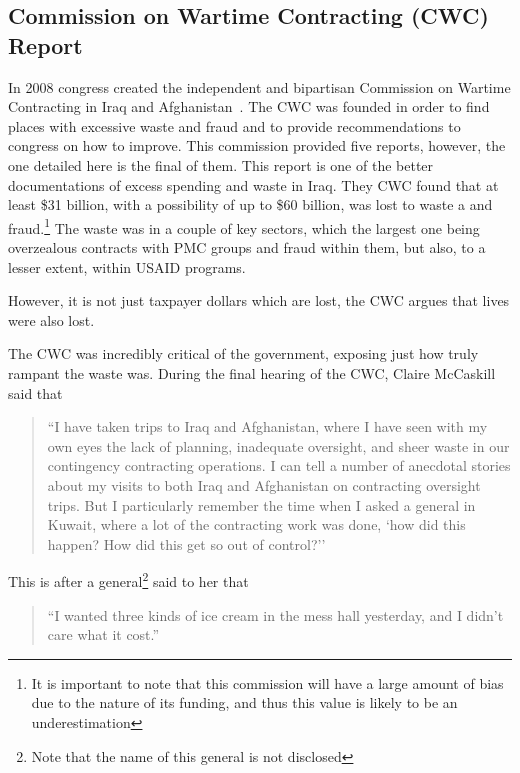 \documentclass{article}
\begin{document}
    \subsection{Commission on Wartime Contracting (CWC) Report}
        In 2008 congress created the independent and bipartisan Commission on Wartime Contracting in Iraq and Afghanistan~\parencite{CWC_2011}. The CWC was founded in order to find places with excessive waste and fraud and to provide recommendations to congress on how to improve. This commission provided five reports, however, the one detailed here is the final of them. This report is one of the better documentations of excess spending and waste in Iraq. They CWC found that at least \$31 billion, with a possibility of up to \$60 billion, was lost to waste a and fraud.\footnote{It is important to note that this commission will have a large amount of bias due to the nature of its funding, and thus this value is likely to be an underestimation} 
        The waste was in a couple of key sectors, which the largest one being overzealous contracts with PMC groups and fraud within them, but also, to a lesser extent, within USAID programs.

        However, it is not just taxpayer dollars which are lost, the CWC argues that lives were also lost. 

        The CWC was incredibly critical of the government, exposing just how truly rampant the waste was. During the final hearing of the CWC, Claire McCaskill said that 
        
        \begin{quote}
            ``I have taken trips to Iraq and Afghanistan, where I have seen with my own eyes the lack of planning, inadequate oversight, and sheer waste in our contingency contracting operations. I can tell a number of anecdotal stories about my visits to both Iraq and Afghanistan on contracting oversight trips. But I particularly remember the time when I asked a general in Kuwait, where a lot of the contracting work was done, `how did this happen? How did this get so out of control?''~\parencite{us_senate2011wartime_contracting}
        \end{quote}

        This is after a general\footnote{Note that the name of this general is not disclosed} said to her that 

        \begin{quote}
            ``I wanted three kinds of ice cream in the mess hall yesterday, and I didn't care what it cost.''~\parencite{us_senate2011wartime_contracting}
        \end{quote}
\end{document}
